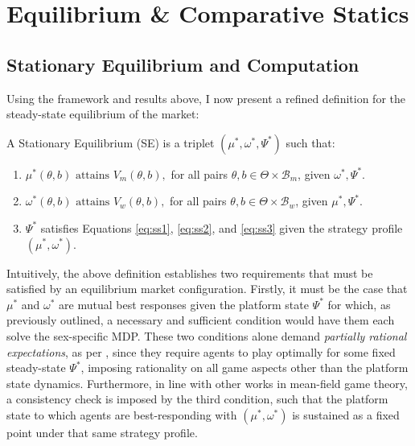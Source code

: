 \section{Equilibrium \& Comparative Statics}
\label{sec:section3} 
\subsection{Stationary Equilibrium and Computation}\label{sec:section3.1} 
Using the framework and results above, I now present a refined definition for the steady-state equilibrium of the market: 
\begin{definition}
    A Stationary Equilibrium (SE) is a triplet $(\mu^*, \omega^*, \Psi^*)$ such that:
    \begin{enumerate}
        \item $ \mu^*(\theta,b) \text{ attains } V_m(\theta,b),$ for all pairs $\theta, b \in \Theta \times \mathcal{B}_m$, given $\omega^*,\Psi^*$.
        \item $ \omega^*(\theta,b) \text{ attains } V_w(\theta,b),$ for all pairs $\theta, b \in \Theta \times \mathcal{B}_w$, given $\mu^*,\Psi^*$.
        \item $\Psi^*$ satisfies Equations \ref{eq:ss1}, \ref{eq:ss2}, and \ref{eq:ss3} given the strategy profile $(\mu^*, \omega^*)$.
    \end{enumerate} 
\end{definition}

Intuitively, the above definition establishes two requirements that must be satisfied by an equilibrium market configuration. 
Firstly, it must be the case that $\mu^*$ and $\omega^*$ are mutual best responses given the platform state $\Psi^*$ for which, as previously outlined, a necessary and sufficient condition would have them each solve the sex-specific MDP. 
These two conditions alone demand \textit{partially rational expectations}, as per \cite{burdett1997marriage}, since they require agents to play optimally for some fixed steady-state $\Psi^*$, imposing rationality on all game aspects other than the platform state dynamics. 
Furthermore, in line with other works in mean-field game theory, a consistency check is imposed by the third condition, such that the platform state to which agents are best-responding with $(\mu^*,\omega^*)$ is sustained as a fixed point under that same strategy profile.

